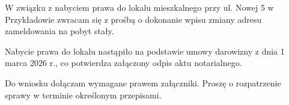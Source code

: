 \documentclass[11pt,a4paper]{article}
\begin{document}






\makeletterhead

W związku z nabyciem prawa do lokalu mieszkalnego przy ul. Nowej 5 w Przykładowie zwracam się z prośbą o dokonanie wpisu zmiany adresu zameldowania na pobyt stały.

{}

Nabycie prawa do lokalu nastąpiło na podstawie umowy darowizny z dnia 1 marca 2026 r., co potwierdza załączony odpis aktu notarialnego.

Do wniosku dołączam wymagane prawem załączniki. Proszę o rozpatrzenie sprawy w terminie określonym przepisami.


\makelettersignature
\end{document}
